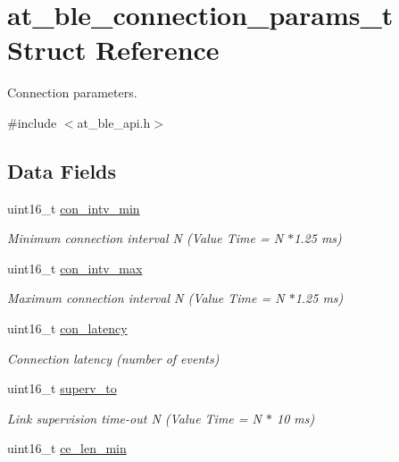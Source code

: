 \hypertarget{structat__ble__connection__params__t}{}\section{at\+\_\+ble\+\_\+connection\+\_\+params\+\_\+t Struct Reference}
\label{structat__ble__connection__params__t}


Connection parameters.  




{\ttfamily \#include $<$at\+\_\+ble\+\_\+api.\+h$>$}

\subsection*{Data Fields}
\begin{DoxyCompactItemize}
\item 
uint16\+\_\+t \mbox{\hyperlink{structat__ble__connection__params__t_a68d4f4fa7525b2b45377b8c4cbdd4c46}{con\+\_\+intv\+\_\+min}}
\begin{DoxyCompactList}\small\item\em Minimum connection interval N (Value Time = N $\ast$1.25 ms) \end{DoxyCompactList}\item 
uint16\+\_\+t \mbox{\hyperlink{structat__ble__connection__params__t_ac54a0ba78bb94b5e8ec8924e7ed2e641}{con\+\_\+intv\+\_\+max}}
\begin{DoxyCompactList}\small\item\em Maximum connection interval N (Value Time = N $\ast$1.25 ms) \end{DoxyCompactList}\item 
uint16\+\_\+t \mbox{\hyperlink{structat__ble__connection__params__t_a7a288732b0f90cff943de752cbeb8df4}{con\+\_\+latency}}
\begin{DoxyCompactList}\small\item\em Connection latency (number of events) \end{DoxyCompactList}\item 
uint16\+\_\+t \mbox{\hyperlink{structat__ble__connection__params__t_a2bfc39c9b1e75f97c055d5978387570d}{superv\+\_\+to}}
\begin{DoxyCompactList}\small\item\em Link supervision time-\/out N (Value Time = N $\ast$ 10 ms) \end{DoxyCompactList}\item 
uint16\+\_\+t \mbox{\hyperlink{structat__ble__connection__params__t_ac2329d8a3be3b5f4ecb8ce47131ea377}{ce\+\_\+len\+\_\+min}}

\end{DoxyCompactItemize}
